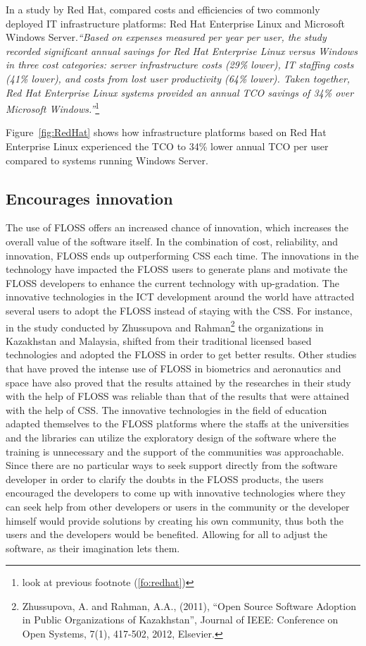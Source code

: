  In a study by Red Hat, compared costs and efficiencies of two commonly deployed IT infrastructure platforms: Red Hat Enterprise Linux and Microsoft Windows Server.\textit{``Based on expenses measured per year per user, the study recorded significant annual savings for Red Hat Enterprise Linux versus Windows in three cost categories: server infrastructure costs (29\% lower), IT staffing costs (41\% lower), and costs from lost user productivity (64\% lower). Taken together, Red Hat Enterprise Linux systems provided an annual TCO savings of 34\% over Microsoft Windows.''}\footnote{look at previous footnote  (\ref{fo:redhat})}

 
Figure~\ref{fig:RedHat} shows how infrastructure platforms based on Red Hat Enterprise Linux experienced the TCO  to 34\% lower annual TCO per user compared to systems running Windows Server.

 \subsection{Encourages innovation}
  The use of FLOSS offers an increased chance of innovation, which increases the overall value of the software itself. In the combination of cost, reliability, and innovation, FLOSS ends up outperforming CSS  each time.
  The innovations in the technology have impacted the FLOSS users to generate plans and motivate the FLOSS developers to enhance the current technology with up-gradation. The innovative technologies in the ICT development around the world have attracted several users to adopt the FLOSS instead of staying with the CSS. For instance, in the study conducted by Zhussupova and Rahman\footnote{Zhussupova, A. and Rahman, A.A., (2011), ``Open Source Software Adoption in Public Organizations of Kazakhstan'', Journal of IEEE: Conference on Open Systems, 7(1), 417-502, 2012, Elsevier.} the organizations in Kazakhstan and Malaysia, shifted from their traditional licensed based technologies and adopted the FLOSS in order to get better results. Other studies that have proved the intense use of FLOSS in biometrics and aeronautics and space have also proved that the results attained by the researches in their study with the help of FLOSS was reliable than that of the results that were attained with the help of CSS. The innovative technologies in the field of education adapted themselves to the FLOSS platforms where the staffs at the universities and the libraries can utilize the exploratory design of the software where the training is unnecessary and the support of the communities was approachable. Since there are no particular ways to seek support directly from the software developer in order to clarify the doubts in the FLOSS products, the users encouraged the developers to come up with innovative technologies where they can seek help from other developers or users in the community or the developer himself would provide solutions by creating his own community, thus both the users and the developers would be benefited. Allowing for all to adjust the software, as their imagination lets them.  
  
